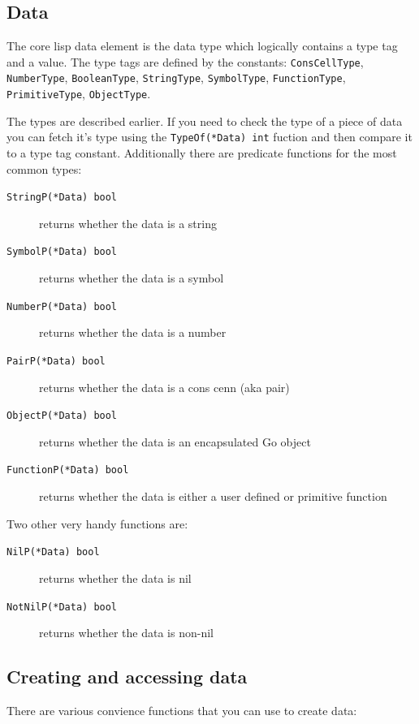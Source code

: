 \documentclass[12pt]{article}
\begin{document}
\subsection{Data}

The core lisp data element is the data type which logically
contains a type tag and a value. The type tags are defined by the
constants: \verb|ConsCellType|, \verb|NumberType|, \verb|BooleanType|,
\verb|StringType|, \verb|SymbolType|, \verb|FunctionType|,
\verb|PrimitiveType|, \verb|ObjectType|.

\noindent The types are described earlier. If you need to check the
type of a piece of data you can fetch it's type using the
\verb|TypeOf(*Data) int| fuction and then compare it to a type tag
constant. Additionally there are predicate functions for the most
common types: 

\begin{description}
\item [{\tt StringP(*Data) bool}] returns whether the data is a string
\item [{\tt SymbolP(*Data) bool}] returns whether the data is a symbol
\item [{\tt NumberP(*Data) bool}] returns whether the data is a number
\item [{\tt PairP(*Data) bool}] returns whether the data is a cons cenn
  (aka pair)
\item [{\tt ObjectP(*Data) bool}] returns whether the data is an
  encapsulated Go object 
\item [{\tt FunctionP(*Data) bool}] returns whether the data is either
  a user defined or primitive function
\end{description}

\noindent Two other very handy functions are:

\begin{description}
\item [{\tt NilP(*Data) bool}] returns whether the data is nil
\item [{\tt NotNilP(*Data) bool}] returns whether the data is non-nil
\end{description}

\subsection{Creating and accessing data}

There are various convience functions that you can use to create data:
\end{document}
